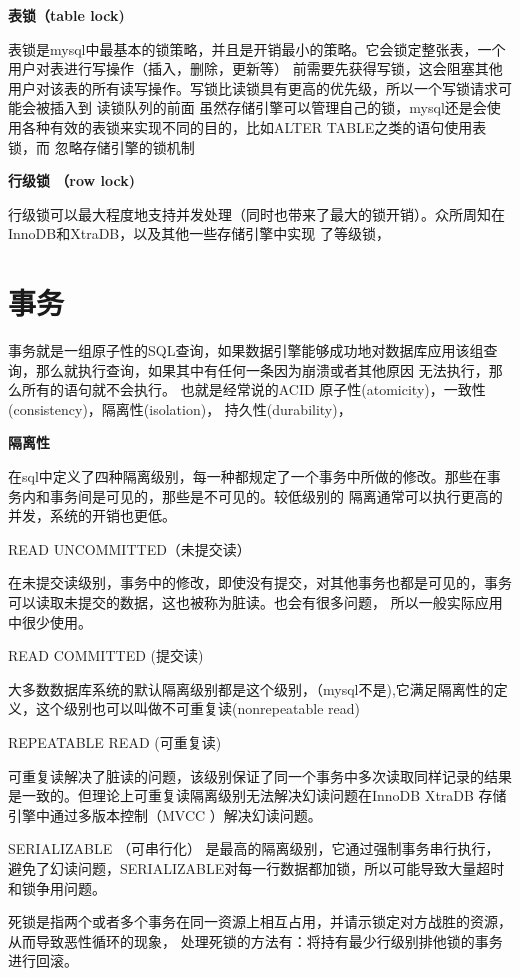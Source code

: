 \documentclass[cyan]{article}
\begin{document}
\textbf{表锁（table lock)}

表锁是mysql中最基本的锁策略，并且是开销最小的策略。它会锁定整张表，一个用户对表进行写操作（插入，删除，更新等）
前需要先获得写锁，这会阻塞其他用户对该表的所有读写操作。写锁比读锁具有更高的优先级，所以一个写锁请求可能会被插入到
读锁队列的前面
虽然存储引擎可以管理自己的锁，mysql还是会使用各种有效的表锁来实现不同的目的，比如ALTER TABLE之类的语句使用表锁，而
忽略存储引擎的锁机制

\textbf{行级锁 （row lock)}

行级锁可以最大程度地支持并发处理（同时也带来了最大的锁开销）。众所周知在InnoDB和XtraDB，以及其他一些存储引擎中实现
了等级锁，


\section{事务}
事务就是一组原子性的SQL查询，如果数据引擎能够成功地对数据库应用该组查询，那么就执行查询，如果其中有任何一条因为崩溃或者其他原因
无法执行，那么所有的语句就不会执行。 也就是经常说的ACID  原子性(atomicity)，一致性(consistency)，隔离性(isolation)，
 持久性(durability)，

 \textbf{隔离性}

 在sql中定义了四种隔离级别，每一种都规定了一个事务中所做的修改。那些在事务内和事务间是可见的，那些是不可见的。较低级别的
 隔离通常可以执行更高的并发，系统的开销也更低。

 READ UNCOMMITTED（未提交读）

 在未提交读级别，事务中的修改，即使没有提交，对其他事务也都是可见的，事务可以读取未提交的数据，这也被称为脏读。也会有很多问题，
 所以一般实际应用中很少使用。

READ COMMITTED (提交读)

大多数数据库系统的默认隔离级别都是这个级别，（mysql不是),它满足隔离性的定义，这个级别也可以叫做不可重复读(nonrepeatable read)

REPEATABLE READ (可重复读)

可重复读解决了脏读的问题，该级别保证了同一个事务中多次读取同样记录的结果是一致的。但理论上可重复读隔离级别无法解决幻读问题在InnoDB
XtraDB 存储引擎中通过多版本控制（MVCC ）解决幻读问题。

SERIALIZABLE （可串行化）
是最高的隔离级别，它通过强制事务串行执行，避免了幻读问题，SERIALIZABLE对每一行数据都加锁，所以可能导致大量超时和锁争用问题。

死锁是指两个或者多个事务在同一资源上相互占用，并请示锁定对方战胜的资源，从而导致恶性循环的现象，
处理死锁的方法有：将持有最少行级别排他锁的事务进行回滚。
\end{document}
